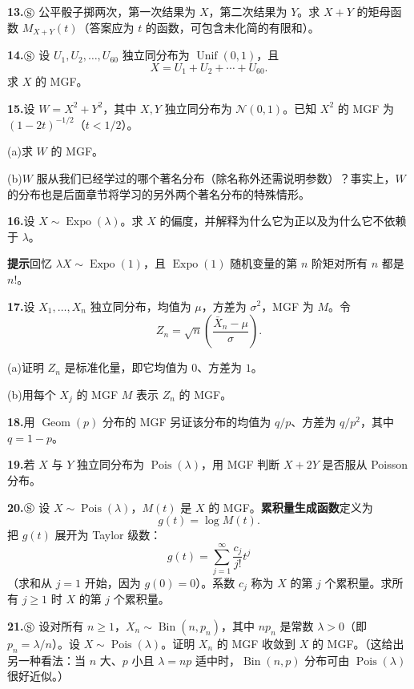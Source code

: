\documentclass[UTF8,12pt,a4paper,fontset=fandol]{ctexart}
\begin{document}
\noindent\textbf{13.}\quad $\circledS$ 公平骰子掷两次，第一次结果为 $X$，第二次结果为 $Y$。求 $X+Y$ 的矩母函数 $M_{X+Y}(t)$（答案应为 $t$ 的函数，可包含未化简的有限和）。

\noindent\textbf{14.}\quad $\circledS$ 设 $U_1,U_2,\ldots,U_{60}$ 独立同分布为 $\operatorname{Unif}(0,1)$，且
\[
  X=U_1+U_2+\cdots+U_{60}.
\]
求 $X$ 的 MGF。

\noindent\textbf{15.}\quad 设 $W=X^2+Y^2$，其中 $X,Y$ 独立同分布为 $\mathcal{N}(0,1)$。已知 $X^2$ 的 MGF 为 $(1-2t)^{-1/2}$（$t<1/2$）。

\noindent (a)\quad 求 $W$ 的 MGF。

\noindent (b)\quad $W$ 服从我们已经学过的哪个著名分布（除名称外还需说明参数）？事实上，$W$ 的分布也是后面章节将学习的另外两个著名分布的特殊情形。

\noindent\textbf{16.}\quad 设 $X\sim\operatorname{Expo}(\lambda)$。求 $X$ 的偏度，并解释为什么它为正以及为什么它不依赖于 $\lambda$。

\noindent\textbf{提示}\quad 回忆 $\lambda X\sim\operatorname{Expo}(1)$，且 $\operatorname{Expo}(1)$ 随机变量的第 $n$ 阶矩对所有 $n$ 都是 $n!$。

\noindent\textbf{17.}\quad 设 $X_1,\ldots,X_n$ 独立同分布，均值为 $\mu$，方差为 $\sigma^2$，MGF 为 $M$。令
\[
  Z_n=\sqrt n\left(\frac{\bar X_n-\mu}{\sigma}\right).
\]

\noindent (a)\quad 证明 $Z_n$ 是标准化量，即它均值为 $0$、方差为 $1$。

\noindent (b)\quad 用每个 $X_j$ 的 MGF $M$ 表示 $Z_n$ 的 MGF。

\noindent\textbf{18.}\quad 用 $\operatorname{Geom}(p)$ 分布的 MGF 另证该分布的均值为 $q/p$、方差为 $q/p^2$，其中 $q=1-p$。

\noindent\textbf{19.}\quad 若 $X$ 与 $Y$ 独立同分布为 $\operatorname{Pois}(\lambda)$，用 MGF 判断 $X+2Y$ 是否服从 Poisson 分布。

\noindent\textbf{20.}\quad $\circledS$ 设 $X\sim\operatorname{Pois}(\lambda)$，$M(t)$ 是 $X$ 的 MGF。\textbf{累积量生成函数}定义为
\[
  g(t)=\log M(t).
\]
把 $g(t)$ 展开为 Taylor 级数：
\[
  g(t)=\sum_{j=1}^{\infty}\frac{c_j}{j!}t^j
\]
（求和从 $j=1$ 开始，因为 $g(0)=0$）。系数 $c_j$ 称为 $X$ 的第 $j$ 个累积量。求所有 $j\ge1$ 时 $X$ 的第 $j$ 个累积量。

\noindent\textbf{21.}\quad $\circledS$ 设对所有 $n\ge1$，$X_n\sim\operatorname{Bin}(n,p_n)$，其中 $np_n$ 是常数 $\lambda>0$（即 $p_n=\lambda/n$）。设 $X\sim\operatorname{Pois}(\lambda)$。证明 $X_n$ 的 MGF 收敛到 $X$ 的 MGF。（这给出另一种看法：当 $n$ 大、$p$ 小且 $\lambda=np$ 适中时，$\operatorname{Bin}(n,p)$ 分布可由 $\operatorname{Pois}(\lambda)$ 很好近似。）
\end{document}
